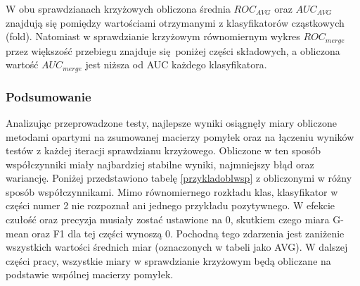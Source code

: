 \par
W obu sprawdzianach krzyżowych obliczona średnia $ROC_{AVG}$ oraz $AUC_{AVG}$ znajdują się pomiędzy wartościami otrzymanymi z klasyfikatorów cząstkowych (fold). Natomiast w sprawdzianie krzyżowym równomiernym wykres $ROC_{merge}$ przez większość przebiegu znajduje się poniżej części składowych, a obliczona wartość $AUC_{merge}$ jest niższa od AUC każdego klasyfikatora.


\subsubsection{Podsumowanie}
Analizując przeprowadzone testy, najlepsze wyniki osiągnęły miary obliczone metodami opartymi na zsumowanej macierzy pomyłek oraz na łączeniu wyników testów z każdej iteracji sprawdzianu krzyżowego. Obliczone w ten sposób współczynniki miały najbardziej stabilne wyniki, najmniejszy błąd oraz wariancję. Poniżej przedstawiono tabelę \ref{przykladoblwsp} z obliczonymi w różny sposób współczynnikami. Mimo równomiernego rozkładu klas, klasyfikator w części numer 2 nie rozpoznał ani jednego przykładu pozytywnego. W efekcie czułość oraz precyzja musiały zostać ustawione na 0, skutkiem czego miara G-mean oraz F1 dla tej części wynoszą 0. Pochodną tego zdarzenia jest zaniżenie wszystkich wartości średnich miar (oznaczonych w tabeli jako AVG). W dalszej części pracy, wszystkie miary w sprawdzianie krzyżowym będą obliczane na podstawie wspólnej macierzy pomyłek. 
